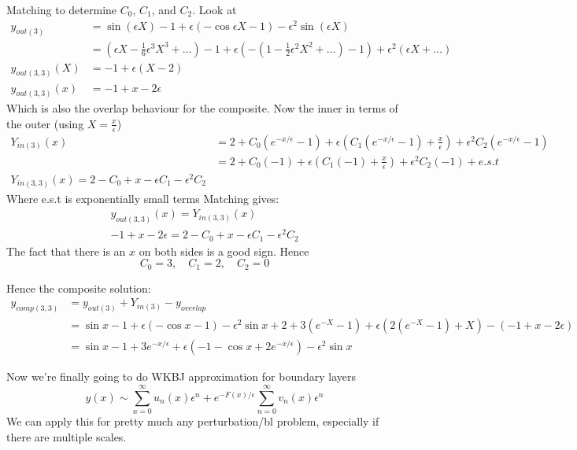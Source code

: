 \documentclass{/home/janmebows/Documents/LatexTemplates/myassignment}
\begin{document}
Matching to determine $C_0$, $C_1$, and $C_2$. Look at 
\begin{align*}
    y_{out(3)} &= \sin(\epsilon X) - 1 +\epsilon(-\cos \epsilon X - 1) - \epsilon^2 \sin(\epsilon X)\\
    &=\left(\epsilon X - \frac16 \epsilon^3 X^3 + \hdots\right) - 1 +\epsilon\left(-\left(1 - \frac12 \epsilon^2 X^2 + \hdots\right) -1 \right) + \epsilon^2(\epsilon X +\hdots) \\
    y_{out(3,3)}(X) &= -1 + \epsilon (X-2)\\
    y_{out(3,3)}(x) &= -1 + x - 2\epsilon
\end{align*}
Which is also the overlap behaviour for the composite.
Now the inner in terms of the outer (using $X = \frac{x}{\epsilon}$)
\begin{align*}
    Y_{in(3)}(x) &= 2 + C_0(e^{-x/\epsilon} -1) + \epsilon (C_1 (e^{-x/\epsilon} -1) +\frac{x}{\epsilon}) + \epsilon^2 C_2 (e^{-x/\epsilon} -1)\\
    &= 2 + C_0( -1) + \epsilon (C_1 (-1) +\frac{x}{\epsilon}) + \epsilon^2 C_2 (-1) + e.s.t\\
    Y_{in(3,3)}(x) = 2 - C_0 + x - \epsilon C_1 - \epsilon^2 C_2
\end{align*}
Where e.s.t is exponentially small terms
Matching gives:
\begin{align*}
    y_{out(3,3)}(x) = Y_{in(3,3)}(x)\\
    -1 + x - 2\epsilon = 2 - C_0 + x - \epsilon C_1 - \epsilon^2 C_2
\end{align*}
The fact that there is an $x$ on both sides is a good sign.
Hence
\[C_0 = 3, \quad C_1 = 2, \quad C_2 = 0\]

Hence the composite solution:
\begin{align*}
    y_{comp(3,3)} &= y_{out(3)} + Y_{in(3)} - y_{overlap}\\
    &= \sin x -1 + \epsilon(-\cos x - 1) - \epsilon^2 \sin x + 2 + 3(e^{-X} -1) + \epsilon(2(e^{-X} -1) + X) - (-1+x - 2\epsilon)\\
    &= \sin x -1 + 3e^{-x/\epsilon} + \epsilon(-1 - \cos x + 2e^{-x/\epsilon}) - \epsilon^2 \sin x
\end{align*}

Now we're finally going to do WKBJ approximation for boundary layers
\[y(x) \sim \sum_{n=0}^\infty u_n (x) \epsilon^n + e^{-F(x)/\epsilon}\sum_{n=0}^\infty v_n(x)\epsilon^n\]
We can apply this for pretty much any perturbation/bl problem, especially if there are multiple scales.
\end{document}
